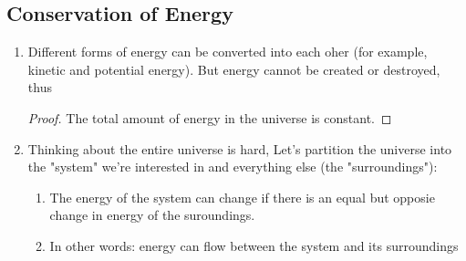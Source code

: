\documentclass[../CHEM152Notes.tex]{subfiles}
\begin{document}
\subsection*{Conservation of Energy}
\begin{enumerate}
    \item Different forms of energy can be converted into each oher (for example, kinetic and potential energy). But energy cannot be created or destroyed, thus
    \begin{proof}
        The total amount of energy in the universe is constant.
    \end{proof}
    \item Thinking about the entire universe is hard, Let's partition the universe into the "system" we're interested in and everything else (the "surroundings"):
        \begin{enumerate}
            \item The energy of the system can change if there is an equal but opposie change in energy of the suroundings.
            \item In other words: energy can flow between the system and its surroundings
        \end{enumerate}
\end{enumerate}
\end{document}
